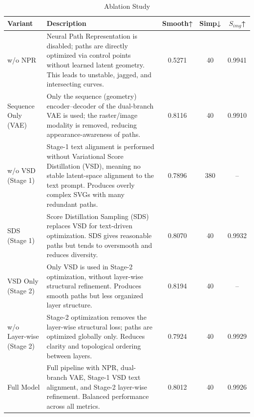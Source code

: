 \begin{table}[h!]
\centering
\caption{Ablation Study}
\begin{tabular}{|l|p{6cm}|c|c|c|}
\hline
\textbf{Variant} & \textbf{Description} & \textbf{Smooth↑} & \textbf{Simp↓} & \textbf{$S_{img}$↑} \\ \hline

w/o NPR &
Neural Path Representation is disabled; paths are directly optimized via control points without learned latent geometry. This leads to unstable, jagged, and intersecting curves. &
0.5271 & 40 & 0.9941 \\ \hline

Sequence Only (VAE) &
Only the sequence (geometry) encoder–decoder of the dual-branch VAE is used; the raster/image modality is removed, reducing appearance-awareness of paths. &
0.8116 & 40 & 0.9910 \\ \hline

w/o VSD (Stage 1) &
Stage-1 text alignment is performed without Variational Score Distillation (VSD), meaning no stable latent-space alignment to the text prompt. Produces overly complex SVGs with many redundant paths. &
0.7896 & 380 & -- \\ \hline

SDS (Stage 1) &
Score Distillation Sampling (SDS) replaces VSD for text-driven optimization. SDS gives reasonable paths but tends to oversmooth and reduces diversity. &
0.8070 & 40 & 0.9932 \\ \hline

VSD Only (Stage 2) &
Only VSD is used in Stage-2 optimization, without layer-wise structural refinement. Produces smooth paths but less organized layer structure. &
0.8194 & 40 & -- \\ \hline

w/o Layer-wise (Stage 2) &
Stage-2 optimization removes the layer-wise structural loss; paths are optimized globally only. Reduces clarity and topological ordering between layers. &
0.7924 & 40 & 0.9929 \\ \hline

Full Model &
Full pipeline with NPR, dual-branch VAE, Stage-1 VSD text alignment, and Stage-2 layer-wise refinement. Balanced performance across all metrics. &
0.8012 & 40 & 0.9926 \\ \hline

\end{tabular}
\end{table}

